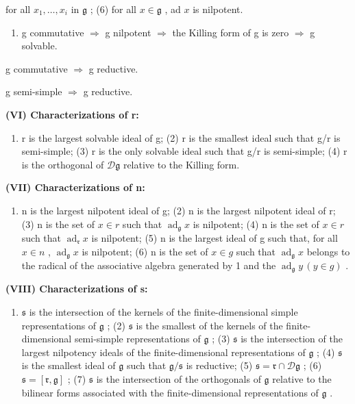for all \(x_{1},\ldots ,x_{i}\) in \(\mathfrak{g}\) ; (6) for all \(x\in \mathfrak{g}\) , ad \(x\) is nilpotent.

\begin{enumerate}
\def\labelenumi{(\Alph{enumi})}
\setcounter{enumi}{21}
\tightlist
\item
  g commutative \(\Rightarrow\) g nilpotent \(\Rightarrow\) the Killing form of g is zero \(\Rightarrow\) g solvable.
\end{enumerate}

g commutative \(\Rightarrow\) g reductive.

g semi-simple \(\Rightarrow\) g reductive.

\textbf{(VI) Characterizations of r:}

\begin{enumerate}
\def\labelenumi{(\arabic{enumi})}
\tightlist
\item
  r is the largest solvable ideal of g; (2) r is the smallest ideal such that g/r is semi-simple; (3) r is the only solvable ideal such that g/r is semi-simple; (4) r is the orthogonal of \(\mathcal{D}\mathfrak{g}\) relative to the Killing form.
\end{enumerate}

\textbf{(VII) Characterizations of n:}

\begin{enumerate}
\def\labelenumi{(\arabic{enumi})}
\tightlist
\item
  n is the largest nilpotent ideal of g; (2) n is the largest nilpotent ideal of r; (3) n is the set of \(x \in r\) such that \(\operatorname{ad}_{\mathfrak{g}} x\) is nilpotent; (4) n is the set of \(x \in r\) such that \(\operatorname{ad}_{\mathfrak{r}} x\) is nilpotent; (5) n is the largest ideal of g such that, for all \(x \in n\) , \(\operatorname{ad}_{\mathfrak{g}} x\) is nilpotent; (6) n is the set of \(x \in g\) such that \(\operatorname{ad}_{\mathfrak{g}} x\) belongs to the radical of the associative algebra generated by 1 and the \(\operatorname{ad}_{\mathfrak{g}} y\,(y \in g)\) .
\end{enumerate}

\textbf{(VIII) Characterizations of s:}

\begin{enumerate}
\def\labelenumi{(\arabic{enumi})}
\tightlist
\item
  \(\mathfrak{s}\) is the intersection of the kernels of the finite-dimensional simple representations of \(\mathfrak{g}\) ; (2) \(\mathfrak{s}\) is the smallest of the kernels of the finite-dimensional semi-simple representations of \(\mathfrak{g}\) ; (3) \(\mathfrak{s}\) is the intersection of the largest nilpotency ideals of the finite-dimensional representations of \(\mathfrak{g}\) ; (4) \(\mathfrak{s}\) is the smallest ideal of \(\mathfrak{g}\) such that \(\mathfrak{g} / \mathfrak{s}\) is reductive; (5) \(\mathfrak{s} = \mathfrak{r} \cap \mathcal{D}\mathfrak{g}\) ; (6) \(\mathfrak{s} = [\mathfrak{r}, \mathfrak{g}]\) ; (7) \(\mathfrak{s}\) is the intersection of the orthogonals of \(\mathfrak{g}\) relative to the bilinear forms associated with the finite-dimensional representations of \(\mathfrak{g}\) .
\end{enumerate}


